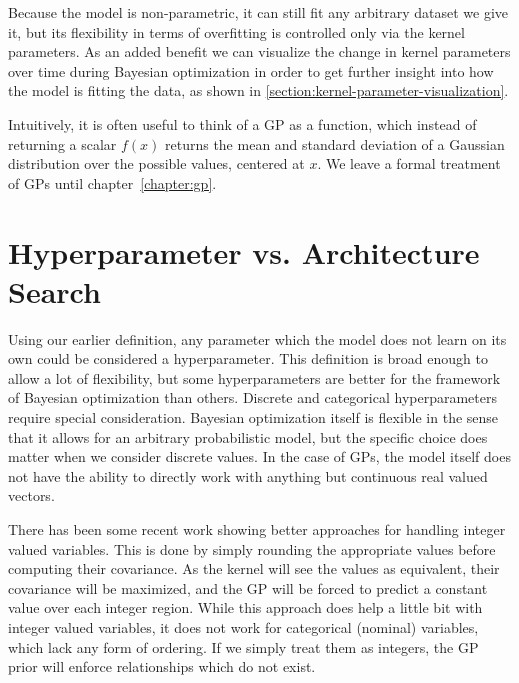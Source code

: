 Because the model is non-parametric, it can still fit any arbitrary dataset we give it, but its flexibility in terms of overfitting is controlled only via the kernel parameters. As an added benefit we can visualize the change in kernel parameters over time during Bayesian optimization in order to get further insight into how the model is fitting the data, as shown in \autoref{section:kernel-parameter-visualization}.

Intuitively, it is often useful to think of a GP as a function, which instead
of returning a scalar $f(x)$ returns the mean and standard deviation of a
Gaussian distribution over the possible values, centered at $x$. We leave a formal
treatment of GPs until chapter~\ref{chapter:gp}.


%
%
%
%
%

\section{Hyperparameter vs. Architecture Search}
\label{section:architecture-search}

Using our earlier definition, any parameter which the model does not learn on
its own could be considered a hyperparameter. This definition is broad enough
to allow a lot of flexibility, but some hyperparameters are better for the
framework of Bayesian optimization than others. Discrete and categorical
hyperparameters require special consideration. Bayesian optimization itself is
flexible in the sense that it allows for an arbitrary probabilistic model, but
the specific choice does matter when we consider discrete values. In the case
of GPs, the model itself does not have the ability to directly work with
anything but continuous real valued vectors.

There has been some recent work \citep{integer-valued-gp} showing better
approaches for handling integer valued variables. This is done by simply
rounding the appropriate values before computing their covariance. As the
kernel will see the values as equivalent, their covariance will be maximized,
and the GP will be forced to predict a constant value over each integer region.
While this approach does help a little bit with integer valued variables, it
does not work for categorical (nominal) variables, which lack any form of
ordering. If we simply treat them as integers, the GP prior will enforce
relationships which do not exist.


